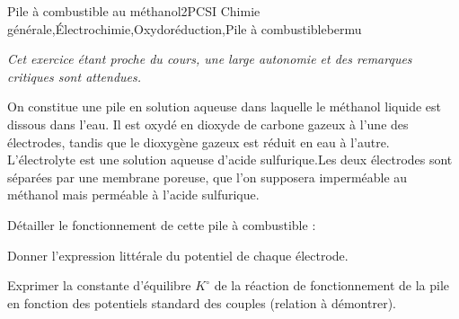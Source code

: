 
\begin{exercise}{Pile à combustible au méthanol}{2}{PCSI}
{Chimie générale,\'Electrochimie,Oxydoréduction,Pile à combustible}{bermu}

\noindent\textsl{Cet exercice étant proche du cours, une large autonomie et des remarques critiques sont attendues.}

On constitue une pile en solution aqueuse dans laquelle le méthanol liquide est dissous dans l’eau. Il est oxydé en dioxyde de carbone gazeux à l’une des électrodes, tandis que le dioxygène gazeux est réduit en eau à l’autre. L’électrolyte est une solution aqueuse d’acide sulfurique.Les deux électrodes sont séparées par une membrane poreuse, que l’on supposera imperméable au méthanol mais perméable à l’acide sulfurique.

\begin{questions}
\questioncours Détailler le fonctionnement de cette pile à combustible :

\question Donner l’expression littérale du potentiel de chaque électrode.

\question Exprimer la constante d’équilibre $K^\circ$ de la réaction de fonctionnement de la pile en fonction des potentiels standard des couples (relation à démontrer).


\end{questions}
\end{exercise}

